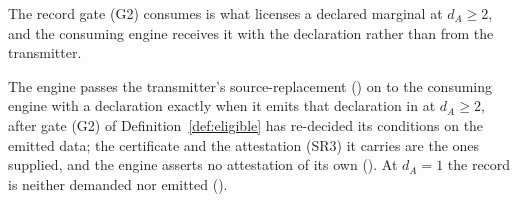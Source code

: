 
The record gate (G2) consumes is what licenses a declared marginal at
$d_A\ge2$, and the consuming engine receives it with the declaration rather
than from the transmitter.

\begin{requirement}\label{req:source-licence-passed-on}
The engine passes the transmitter's source-replacement 
 () on to the
consuming engine with a declaration exactly when it emits that declaration in
 at $d_A\ge2$, after gate (G2) of
Definition~\ref{def:eligible} has re-decided its conditions on the emitted
data; the certificate and the attestation (SR3) it carries are the ones
supplied, and the engine asserts no attestation of its own
(). At $d_A=1$ the record is neither
demanded nor emitted ().
\end{requirement}
